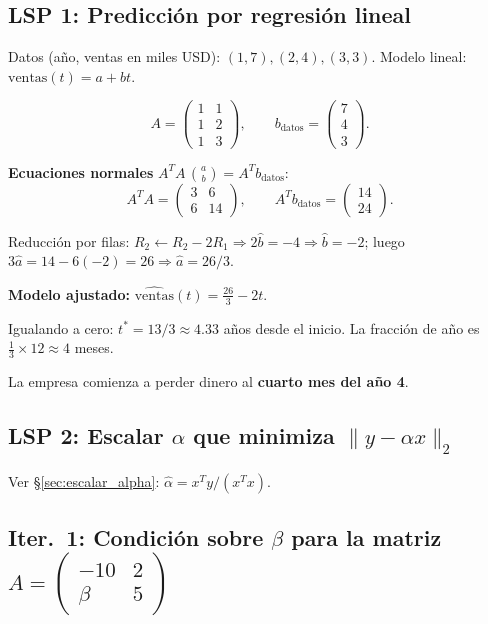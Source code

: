 \documentclass[11pt,a4paper]{article}
\begin{document}
\subsection{LSP 1: Predicción por regresión lineal}
\label{sec:lsp_regresion}

Datos (año, ventas en miles USD): $(1,7),(2,4),(3,3)$. Modelo lineal: $\text{ventas}(t) = a + bt$.

\[
  A = \begin{pmatrix}1&1\\1&2\\1&3\end{pmatrix}, \qquad
  b_{\text{datos}} = \begin{pmatrix}7\\4\\3\end{pmatrix}.
\]

\textbf{Ecuaciones normales} $A^TA\,\binom{a}{b} = A^Tb_{\text{datos}}$:
\[
  A^TA = \begin{pmatrix}3&6\\6&14\end{pmatrix}, \qquad
  A^Tb_{\text{datos}} = \begin{pmatrix}14\\24\end{pmatrix}.
\]

Reducción por filas: $R_2 \leftarrow R_2 - 2R_1 \Rightarrow 2\hat{b} = -4 \Rightarrow \hat{b} = -2$;
luego $3\hat{a} = 14 - 6(-2) = 26 \Rightarrow \hat{a} = 26/3$.

\textbf{Modelo ajustado:} $\widehat{\text{ventas}}(t) = \tfrac{26}{3} - 2t$.

Igualando a cero: $t^* = 13/3 \approx 4.33$ años desde el inicio.
La fracción de año es $\tfrac{1}{3} \times 12 \approx 4$ meses.

\begin{tcolorbox}[clave]
La empresa comienza a perder dinero al \textbf{cuarto mes del año 4}.
\end{tcolorbox}

\subsection{LSP 2: Escalar $\alpha$ que minimiza $\|y-\alpha x\|_2$}

Ver \S\ref{sec:escalar_alpha}: $\hat{\alpha} = x^Ty/(x^Tx)$.

\subsection{Iter.\ 1: Condición sobre $\beta$ para la matriz $A=\begin{pmatrix}-10&2\\\beta&5\end{pmatrix}$}
\label{sec:beta_condicion}
\end{document}
